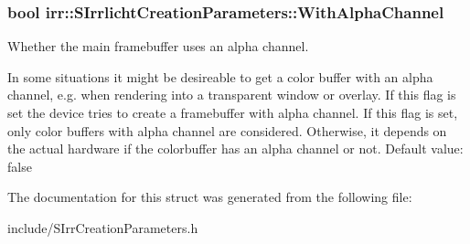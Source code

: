 \subsubsection[{\texorpdfstring{With\+Alpha\+Channel}{WithAlphaChannel}}]{\setlength{\rightskip}{0pt plus 5cm}bool irr\+::\+S\+Irrlicht\+Creation\+Parameters\+::\+With\+Alpha\+Channel}\hypertarget{structirr_1_1SIrrlichtCreationParameters_acae5b5e41cec776aa4d05a03f16c57f2}{}\label{structirr_1_1SIrrlichtCreationParameters_acae5b5e41cec776aa4d05a03f16c57f2}


Whether the main framebuffer uses an alpha channel. 

In some situations it might be desireable to get a color buffer with an alpha channel, e.\+g. when rendering into a transparent window or overlay. If this flag is set the device tries to create a framebuffer with alpha channel. If this flag is set, only color buffers with alpha channel are considered. Otherwise, it depends on the actual hardware if the colorbuffer has an alpha channel or not. Default value\+: false 

The documentation for this struct was generated from the following file\+:\begin{DoxyCompactItemize}
\item 
include/S\+Irr\+Creation\+Parameters.\+h\end{DoxyCompactItemize}
